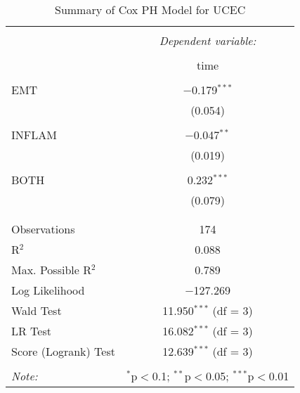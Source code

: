 
\begin{table}[!htbp] \centering 
  \caption{Summary of Cox PH Model for UCEC} 
  \label{table:UCEC_cph} 
\begin{tabular}{@{\extracolsep{5pt}}lc} 
\\[-1.8ex]\hline 
\hline \\[-1.8ex] 
 & \multicolumn{1}{c}{\textit{Dependent variable:}} \\ 
\cline{2-2} 
\\[-1.8ex] & time \\ 
\hline \\[-1.8ex] 
 EMT & $-$0.179$^{***}$ \\ 
  & (0.054) \\ 
  & \\ 
 INFLAM & $-$0.047$^{**}$ \\ 
  & (0.019) \\ 
  & \\ 
 BOTH & 0.232$^{***}$ \\ 
  & (0.079) \\ 
  & \\ 
\hline \\[-1.8ex] 
Observations & 174 \\ 
R$^{2}$ & 0.088 \\ 
Max. Possible R$^{2}$ & 0.789 \\ 
Log Likelihood & $-$127.269 \\ 
Wald Test & 11.950$^{***}$ (df = 3) \\ 
LR Test & 16.082$^{***}$ (df = 3) \\ 
Score (Logrank) Test & 12.639$^{***}$ (df = 3) \\ 
\hline 
\hline \\[-1.8ex] 
\textit{Note:}  & \multicolumn{1}{r}{$^{*}$p$<$0.1; $^{**}$p$<$0.05; $^{***}$p$<$0.01} \\ 
\end{tabular} 
\end{table} 
